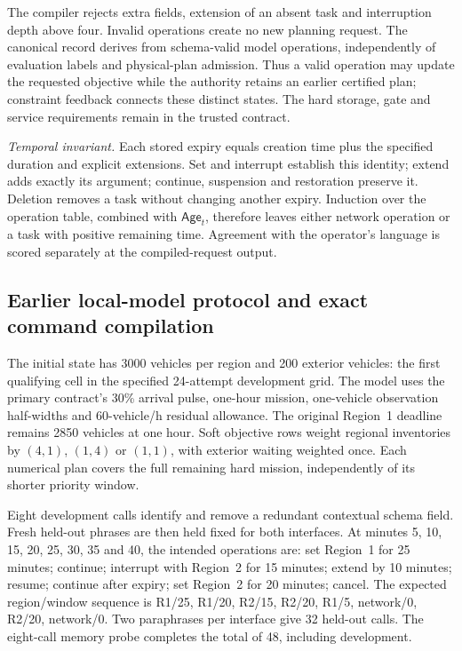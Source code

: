 \documentclass[preprint,12pt]{elsarticle}
\numberwithin{equation}{section}
\begin{document}
The compiler rejects extra fields, extension of an absent task and
interruption depth above four. Invalid operations create no new planning
request. The canonical record derives from schema-valid model operations,
independently of evaluation labels and physical-plan admission. Thus a valid
operation may update the requested objective while the authority retains an
earlier certified plan; constraint feedback connects these distinct states.
The hard storage, gate and service requirements remain in the trusted contract.

\emph{Temporal invariant.} Each stored expiry equals creation time plus the
specified duration and explicit extensions. Set and interrupt establish this
identity; extend adds exactly its argument; continue, suspension and restoration
preserve it. Deletion removes a task without changing another expiry.
Induction over the operation table, combined with $\mathsf{Age}_t$, therefore leaves either
network operation or a task with positive remaining time. Agreement with the
operator's language is scored separately at the compiled-request output.

\subsection{Earlier local-model protocol and exact command compilation}

The initial state has 3000 vehicles per region and 200 exterior vehicles:
the first qualifying cell in the specified 24-attempt development grid.
The model uses the primary contract's 30\% arrival pulse, one-hour mission,
one-vehicle observation half-widths and 60-vehicle/h residual allowance.
The original Region~1 deadline remains 2850 vehicles at one hour. Soft
objective rows weight regional inventories by $(4,1)$, $(1,4)$ or $(1,1)$,
with exterior waiting weighted once. Each numerical plan covers the full
remaining hard mission, independently of its shorter priority window.

Eight development calls identify and remove a redundant contextual schema
field. Fresh held-out phrases are then held fixed for both interfaces.
At minutes 5, 10, 15, 20, 25, 30, 35 and 40, the intended operations are:
set Region~1 for 25 minutes; continue; interrupt with Region~2 for 15 minutes;
extend by 10 minutes; resume; continue after expiry; set Region~2 for
20 minutes; cancel. The expected region/window sequence is
R1/25, R1/20, R2/15, R2/20, R1/5, network/0, R2/20, network/0.
Two paraphrases per interface give 32 held-out calls. The eight-call memory
probe completes the total of 48, including development.
\end{document}
